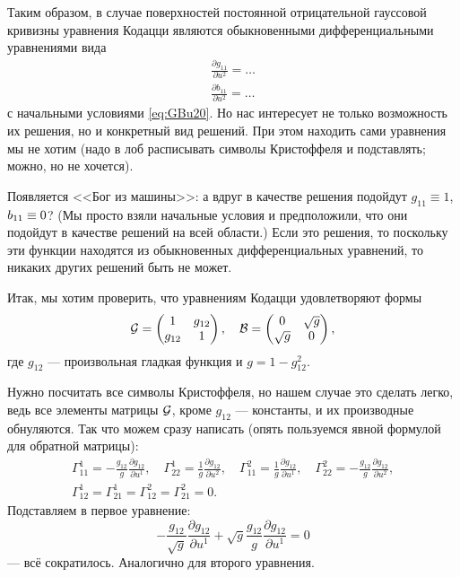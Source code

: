 Таким образом, в случае поверхностей постоянной отрицательной гауссовой кривизны уравнения Кодацци являются обыкновенными дифференциальными уравнениями вида
\begin{gather*}
	\frac{\partial g_{11}}{\partial u^2} = \ldots\\
	\frac{\partial b_{11}}{\partial u^2} = \ldots
\end{gather*}
с начальными условиями \eqref{eq:GBu20}. Но нас интересует не только возможность их решения, но и конкретный вид решений. При этом находить сами уравнения мы не хотим (надо в лоб расписывать символы Кристоффеля и подставлять; можно, но не хочется).

Появляется <<Бог из машины>>: а вдруг в качестве решения подойдут $g_{11} \equiv 1$, $b_{11} \hm\equiv 0$? (Мы просто взяли начальные условия и предположили, что они подойдут в качестве решений на всей области.) Если это решения, то поскольку эти функции находятся из обыкновенных дифференциальных уравнений, то никаких других решений быть не может.

Итак, мы хотим проверить, что уравнениям Кодацци удовлетворяют формы
\[
	\mathcal{G} =
	\begin{pmatrix}
		1 & g_{12}\\
		g_{12} & 1
	\end{pmatrix},\quad
	\mathcal{B} =
	\begin{pmatrix}
		0 & \sqrt{g}\\
		\sqrt{g} & 0
	\end{pmatrix},
\]
где $g_{12}$ --- произвольная гладкая функция и $g = 1 - g_{12}^2$.

Нужно посчитать все символы Кристоффеля, но нашем случае это сделать легко, ведь все элементы матрицы $\mathcal{G}$, кроме $g_{12}$ --- константы, и их производные обнуляются. Так что можем сразу написать (опять пользуемся явной формулой для обратной матрицы):
\begin{equation} \label{eq:ChristoffelNegativeK}
    \begin{gathered}
        \Gamma_{11}^1 = -\frac{g_{12}}{g} \frac{\partial g_{12}}{\partial u^1}, \quad \Gamma_{22}^1 = \frac{1}{g} \frac{\partial g_{12}}{\partial u^2}, \quad \Gamma_{11}^2 = \frac{1}{g} \frac{\partial g_{12}}{\partial u^1}, \quad \Gamma_{22}^2 = -\frac{g_{12}}{g} \frac{\partial g_{12}}{\partial u^2}, \\
        \Gamma_{12}^1 = \Gamma_{21}^1 = \Gamma_{12}^2 = \Gamma_{21}^2 = 0.
    \end{gathered}
\end{equation}
Подставляем в первое уравнение:
\[
	-\frac{g_{12}}{\sqrt{g}}\frac{\partial g_{12}}{\partial u^1} + \sqrt{g}\frac{g_{12}}{g}\frac{\partial g_{12}}{\partial u^1} = 0
\]
--- всё сократилось. Аналогично для второго уравнения.

